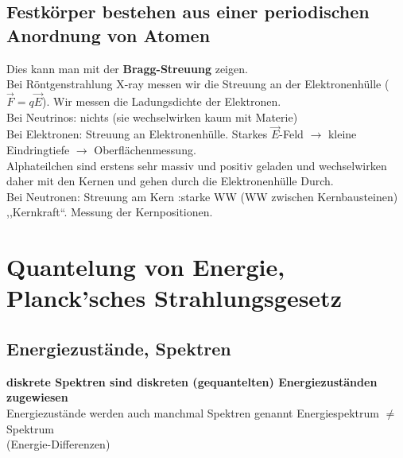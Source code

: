 \subsection{Festkörper bestehen aus einer periodischen Anordnung von Atomen}

Dies kann man mit der \textbf{Bragg-Streuung} zeigen.\\[5pt]
Bei Röntgenstrahlung X-ray messen wir die Streuung an der Elektronenhülle ($ \vec{F} = q \vec{E} $). Wir messen die Ladungsdichte der Elektronen.\\
Bei Neutrinos: nichts (sie wechselwirken kaum mit Materie)\\
Bei Elektronen: Streuung an Elektronenhülle. Starkes $ \vec{E} $-Feld $ \rightarrow $ kleine Eindringtiefe $ \rightarrow $ Oberflächenmessung.\\
Alphateilchen sind erstens sehr massiv und positiv geladen und wechselwirken daher mit den Kernen und gehen durch die Elektronenhülle Durch.\\
Bei Neutronen: Streuung am Kern :starke WW (WW zwischen Kernbausteinen) ,,Kernkraft``. Messung der Kernpositionen.\\

\section{Quantelung von Energie, Planck'sches Strahlungsgesetz}

\subsection{Energiezustände, Spektren}

\begin{minipage}{.6\linewidth}
	\textbf{diskrete Spektren sind diskreten (gequantelten) Energiezuständen zugewiesen}\\
	Energiezustände werden auch manchmal Spektren genannt Energiespektrum $ \neq $ Spektrum \\(Energie-Differenzen)
\end{minipage}%
\begin{minipage}{.4\linewidth}
	\flushright
\end{minipage}%

